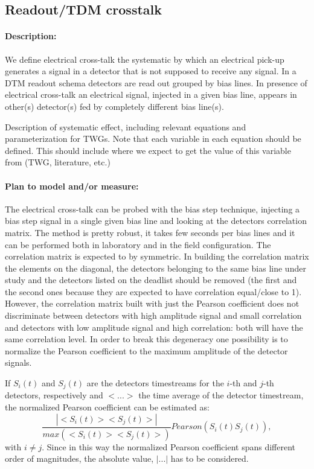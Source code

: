 \subsection{Readout/TDM crosstalk}

\paragraph{Description:}
We define electrical cross-talk the systematic by which an electrical pick-up generates a signal in a detector that is not supposed to receive any signal.
In a DTM readout schema detectors are read out grouped by bias lines. In presence of electrical cross-talk an electrical signal, injected in a given bias line, appears in other(s) detector(s) fed by completely different bias line(s). 




Description of systematic effect, including relevant equations and
parameterization for TWGs. Note that each variable in each equation should be
defined. This should include where we expect to get the value of this variable
from (TWG, literature, etc.)

\paragraph{Plan to model and/or measure:}
The electrical cross-talk can be probed with the bias step technique, injecting a bias step signal in a single given bias line and looking at the detectors correlation matrix. The method is pretty robust, it takes few seconds per bias lines and it can be performed both in laboratory and in the field configuration. The correlation matrix is expected to by symmetric. In building the correlation matrix the elements on the diagonal, the detectors belonging to the same bias line under study and the detectors listed on the deadlist should be removed (the first and the second ones because they are expected to have correlation equal/close to 1).
However, the correlation matrix built with just the Pearson coefficient does not discriminate between detectors with high amplitude signal and small correlation and detectors with low amplitude signal and high correlation: both will have the same correlation level.
In order to break this degeneracy one possibility is to normalize the Pearson coefficient to the maximum amplitude of the detector signals. 

If $S_{i}(t)$ and $S_{j}(t)$ are the detectors timestreams for the $i$-th and $j$-th detectors, respectively and $< ...>$ the time average of the detector timestream, the normalized Pearson coefficient can be estimated as:
\begin{equation}\label{Pearson}
  \frac{|<S_{i}(t)> <S_{j}(t)>|}{max(<S_{i}(t)> <S_{j}(t)>)} Pearson(S_{i}(t) S_{j}(t)),
\end{equation}
with $i \neq j$.
Since in this way the normalized Pearson coefficient spans different order of magnitudes, the absolute value, $|...|$ has to be considered. 


